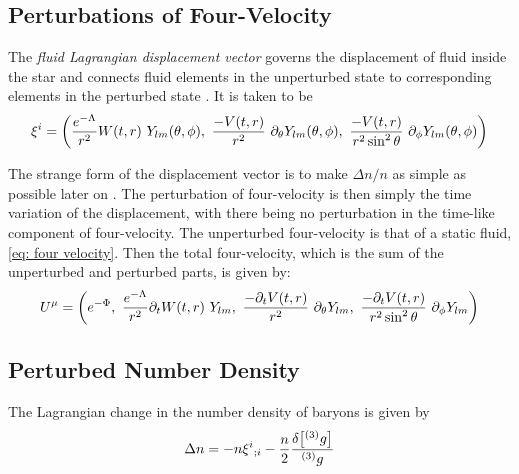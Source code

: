 \documentclass[a4paper,12pt,onehalfspacing]{report}
\begin{document}
\subsection{Perturbations of Four-Velocity}

The \emph{fluid Lagrangian displacement vector} governs the displacement of fluid inside the star and connects fluid elements in the unperturbed state to corresponding elements in the perturbed state \cite{Shapiro_T}. It is taken to be \cite{Sotani}
\begin{equation}
    \xi^i= \qty(\frac{e^{-\Lambda}}{r^2}W(t,r)\  Y_{lm}(\theta, \phi),\ \frac{-V(t,r)}{r^2} \ \partial_\theta Y_{lm}(\theta, \phi), \ \frac{-V(t,r)}{r^2\sin^2\theta}\  \partial_\phi Y_{lm}(\theta, \phi))  
\end{equation}

The strange form of the displacement vector is to make $\Delta n/n$ as simple as possible later on \cite{Thorne_Campo}. The perturbation of four-velocity is then simply the time variation of the displacement, with there being no perturbation in the time-like component of four-velocity. The unperturbed four-velocity is that of a static fluid, \cref{eq: four velocity}. Then the total four-velocity, which is the sum of the unperturbed and perturbed parts, is given by:
\begin{equation}
    U^\mu= \qty(e^{-\Phi},\ \frac{e^{-\Lambda}}{r^2}\partial_t W(t,r)\ Y_{lm},\ \frac{-\partial_t V(t,r)}{r^2} \ \partial_\theta Y_{lm}, \ \frac{-\partial_tV(t,r)}{r^2\sin^2\theta}\  \partial_\phi Y_{lm})\label{eq: pert U} 
\end{equation}

\subsection{Perturbed Number Density}

The Lagrangian change in the number density of baryons is given by \cite{Thorne_Campo}
$$\Delta n= -n\xi^i{}_{;i} -\frac{n}{2}\frac{\delta\qty[{}^{(3)}g]}{{}^{(3)}g}$$
\end{document}

